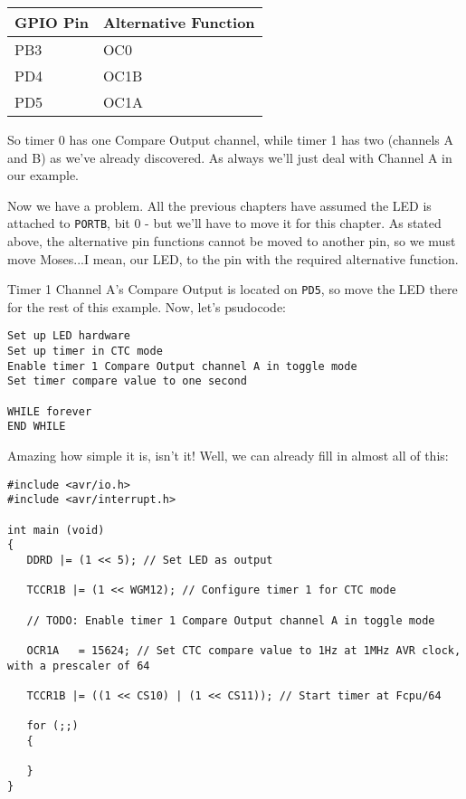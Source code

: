 \documentclass[a4paper,oneside,notitlepage]{book}
\begin{document}
\begin{center}
\begin{tabular}{|l|l|}
	\hline
	GPIO Pin & Alternative Function \\
	\hline
	PB3 & OC0  \\
	PD4 & OC1B \\
	PD5 & OC1A \\
	\hline
\end{tabular}
\end{center}

So timer 0 has one Compare Output channel, while timer 1 has two (channels A and B) as we've already discovered. As always we'll just deal with Channel A in our example.

Now we have a problem. All the previous chapters have assumed the LED is attached to \texttt{PORTB}, bit 0 - but we'll have to move it for this chapter. As stated above, the alternative pin functions cannot be moved to another pin, so we must move Moses...I mean, our LED, to the pin with the required alternative function.

Timer 1 Channel A's Compare Output is located on \texttt{PD5}, so move the LED there for the rest of this example. Now, let's psudocode:

\begin{center}
\begin{lstlisting}[keywordstyle=\color{black},commentstyle=\color{black}]
Set up LED hardware
Set up timer in CTC mode
Enable timer 1 Compare Output channel A in toggle mode
Set timer compare value to one second

WHILE forever
END WHILE
\end{lstlisting}
\end{center}

Amazing how simple it is, isn't it! Well, we can already fill in almost all of this:

\begin{center}
\begin{lstlisting}
#include <avr/io.h>
#include <avr/interrupt.h>

int main (void)
{
   DDRD |= (1 << 5); // Set LED as output

   TCCR1B |= (1 << WGM12); // Configure timer 1 for CTC mode

   // TODO: Enable timer 1 Compare Output channel A in toggle mode

   OCR1A   = 15624; // Set CTC compare value to 1Hz at 1MHz AVR clock, with a prescaler of 64

   TCCR1B |= ((1 << CS10) | (1 << CS11)); // Start timer at Fcpu/64

   for (;;)
   {

   }
}
\end{lstlisting}
\end{center}
\end{document}
